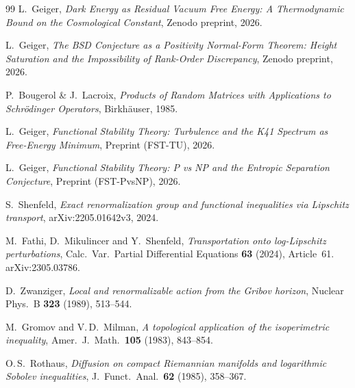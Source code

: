\documentclass[12pt,a4paper]{article}
\theoremstyle{definition}
\theoremstyle{plain}
\theoremstyle{remark}
\begin{document}
\begin{thebibliography}{99}
L.~Geiger, \emph{Dark Energy as Residual Vacuum Free Energy: A Thermodynamic Bound on the Cosmological Constant}, Zenodo preprint, 2026.

L.~Geiger, \emph{The BSD Conjecture as a Positivity Normal-Form Theorem: Height Saturation and the Impossibility of Rank-Order Discrepancy}, Zenodo preprint, 2026.

P.~Bougerol \& J.~Lacroix, \emph{Products of Random Matrices with Applications to Schr\"odinger Operators}, Birkh\"auser, 1985.

L.~Geiger, \emph{Functional Stability Theory: Turbulence and the K41 Spectrum as Free-Energy Minimum}, Preprint (FST-TU), 2026.

L.~Geiger, \emph{Functional Stability Theory: P vs NP and the Entropic Separation Conjecture}, Preprint (FST-PvsNP), 2026.

S.~Shenfeld, \emph{Exact renormalization group and functional inequalities via Lipschitz transport}, arXiv:2205.01642v3, 2024.

M.~Fathi, D.~Mikulincer and Y.~Shenfeld, \emph{Transportation onto log-Lipschitz perturbations}, Calc.\ Var.\ Partial Differential Equations \textbf{63} (2024), Article~61. arXiv:2305.03786.

D.~Zwanziger, \emph{Local and renormalizable action from the Gribov horizon}, Nuclear Phys.\ B \textbf{323} (1989), 513--544.

M.~Gromov and V.\,D.~Milman, \emph{A topological application of the isoperimetric inequality}, Amer.\ J.\ Math.\ \textbf{105} (1983), 843--854.

O.\,S.~Rothaus, \emph{Diffusion on compact Riemannian manifolds and logarithmic Sobolev inequalities}, J.~Funct.\ Anal.\ \textbf{62} (1985), 358--367.

\end{thebibliography}
\end{document}
